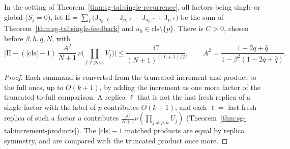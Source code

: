 \begin{theorem}
\label{thm:sg-tal:single-II}
\leanok
{}
In the setting of Theorem~\ref{thm:sg-tal:single-recurrence}, all factors being single or global
($S_j=0$), let $\mathrm{II}=\sum_\ell\big(\mathrm J_{a_p,\ell}-\mathrm J_{p,\ell}-\mathrm J_{a_p,*}+\mathrm J_{p,*}\big)$
be the sum of Theorem~\ref{thm:sg-tal:single-feedback} and $u_0\in\mathrm{cls}\setminus\{p\}$. There is $C>0$,
chosen before $\beta,h,q,N$, with
\[
 \Big|\mathrm{II}-(|\mathrm{cls}|-1)\,\frac{A^2}{N+1}\,\nu\Big(\prod_{j\ne p,u_0}V_j\Big)\Big|
 \le\frac{C}{(N+1)^{(|J|+1)/2}},\qquad A^2=\frac{1-2q+\hat q}{1-\beta^2(1-2q+\hat q)}.
\]
\end{theorem}
\begin{proof}
\leanok
Each summand is converted from the truncated increment and product to the full ones, up to $O(k+1)$,
by adding the increment as one more factor of the truncated-to-full comparison. A replica $\ell$ that is
not the last fresh replica of a single factor with the label of $p$ contributes $O(k+1)$, and each
$\ell=$ last fresh replica of such a factor $u$ contributes $\frac{A^2}{N+1}\nu(\prod_{j\ne p,u}U_j)$
(Theorem~\ref{thm:sg-tal:increment-products}). The $|\mathrm{cls}|-1$ matched products are equal
by replica symmetry, and are compared with the truncated product once more.
\end{proof}

